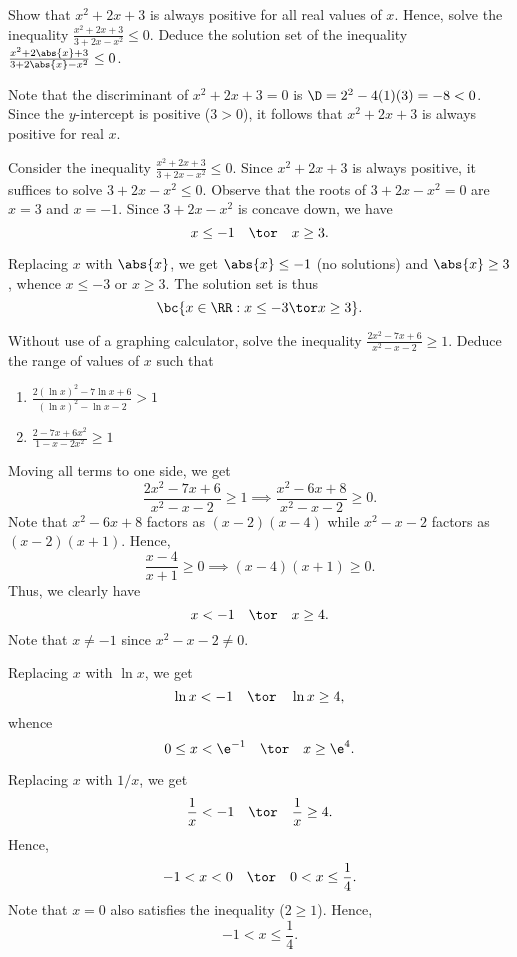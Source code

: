 \begin{problem}
    Show that $x^2 + 2x + 3$ is always positive for all real values of $x$. Hence, solve the inequality $\frac{x^2 + 2x + 3}{3 + 2x - x^2} \leq 0$. Deduce the solution set of the inequality $\frac{x^2 + 2\abs{x} + 3}{3 + 2\abs{x} - x^2} \leq 0$.
\end{problem}
\begin{solution}
    Note that the discriminant of $x^2 + 2x + 3 = 0$ is $\D = 2^2 - 4(1)(3) = -8 < 0$. Since the $y$-intercept is positive ($3 > 0$), it follows that $x^2 + 2x + 3$ is always positive for real $x$.

    Consider the inequality $\frac{x^2 + 2x + 3}{3 + 2x - x^2} \leq 0$. Since $x^2 + 2x + 3$ is always positive, it suffices to solve $3 + 2x - x^2 \leq 0$. Observe that the roots of $3 + 2x - x^2 = 0$ are $x = 3$ and $x = -1$. Since $3 + 2x - x^2$ is concave down, we have \[x \leq -1 \quad \tor \quad x \geq 3.\]

    Replacing $x$ with $\abs{x}$, we get $\abs{x} \leq -1$ (no solutions) and $\abs{x} \geq 3$, whence $x \leq -3$ or $x \geq 3$. The solution set is thus \[\bc{x \in \RR : x \leq -3 \tor x \geq 3}.\]
\end{solution}

\clearpage
\begin{problem}
    Without use of a graphing calculator, solve the inequality $\frac{2x^2 - 7x + 6}{x^2 - x - 2} \geq 1$. Deduce the range of values of $x$ such that
    \begin{enumerate}
        \item $\frac{2(\ln x)^2 - 7\ln x + 6}{(\ln x)^2 - \ln x - 2} > 1$
        \item $\frac{2 - 7x + 6x^2}{1 - x - 2x^2} \geq 1$
    \end{enumerate}
\end{problem}
\begin{solution}
    Moving all terms to one side, we get \[\frac{2x^2 - 7x + 6}{x^2 - x - 2} \geq 1 \implies \frac{x^2 - 6x + 8}{x^2 - x - 2} \geq 0.\] Note that $x^2 - 6x + 8$ factors as $(x-2)(x-4)$ while $x^2 - x - 2$ factors as $(x-2)(x+1)$. Hence, \[\frac{x-4}{x+1} \geq 0 \implies (x-4)(x+1) \geq 0.\] Thus, we clearly have \[x < -1 \quad \tor \quad x \geq 4.\] Note that $x \neq -1$ since $x^2 - x - 2 \neq 0$.

    \begin{ppart}
        Replacing $x$ with $\ln x$, we get \[\ln x < -1 \quad \tor \quad \ln x \geq 4,\] whence \[0 \leq x < \e^{-1} \quad \tor \quad x \geq \e^4.\]
    \end{ppart}
    \begin{ppart}
        Replacing $x$ with $1/x$, we get \[\frac1x < -1 \quad \tor \quad \frac1x \geq 4.\] Hence, \[-1 < x < 0 \quad \tor \quad 0 < x \leq \frac14.\] Note that $x = 0$ also satisfies the inequality ($2 \geq 1$). Hence, \[-1 < x \leq \frac14.\]
    \end{ppart}
\end{solution}

